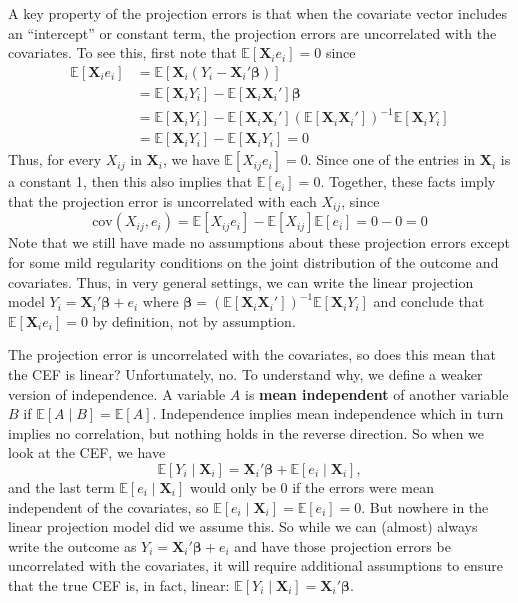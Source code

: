 \documentclass[
  13pt,
  letterpaper,
  DIV=11,
  numbers=noendperiod]{scrreprt}
\newcommand{\mb}{\bm}
\newcommand{\E}{\mathbb{E}}
\newcommand{\cov}{\text{cov}}
\newcommand{\X}{\mb{X}}
\newcommand{\bfbeta}{\mb{\beta}}
\theoremstyle{plain}
\theoremstyle{plain}
\theoremstyle{definition}
\theoremstyle{definition}
\theoremstyle{remark}
\begin{document}
A key property of the projection errors is that when the covariate
vector includes an ``intercept'' or constant term, the projection errors
are uncorrelated with the covariates. To see this, first note that
\(\E[\X_{i}e_{i}] = 0\) since \[ 
\begin{aligned}
  \E[\X_{i}e_{i}] &= \E[\X_{i}(Y_{i} - \X_{i}'\bfbeta)] \\
                  &= \E[\X_{i}Y_{i}] - \E[\X_{i}\X_{i}']\bfbeta \\
                  &= \E[\X_{i}Y_{i}] - \E[\X_{i}\X_{i}']\left(\E[\X_{i}\X_{i}']\right)^{-1}\E[\X_{i}Y_{i}] \\
  &= \E[\X_{i}Y_{i}] - \E[\X_{i}Y_{i}] = 0
\end{aligned}
\] Thus, for every \(X_{ij}\) in \(\X_{i}\), we have
\(\E[X_{ij}e_{i}] = 0\). Since one of the entries in \(\X_i\) is a
constant 1, then this also implies that \(\E[e_{i}] = 0\). Together,
these facts imply that the projection error is uncorrelated with each
\(X_{ij}\), since \[ 
\cov(X_{ij}, e_{i}) = \E[X_{ij}e_{i}] - \E[X_{ij}]\E[e_{i}] = 0 - 0 = 0
\] Note that we still have made no assumptions about these projection
errors except for some mild regularity conditions on the joint
distribution of the outcome and covariates. Thus, in very general
settings, we can write the linear projection model
\(Y_i = \X_i'\bfbeta + e_i\) where
\(\bfbeta = \left(\E[\X_{i}\X_{i}']\right)^{-1}\E[\X_{i}Y_{i}]\) and
conclude that \(\E[\X_{i}e_{i}] = 0\) by definition, not by assumption.

The projection error is uncorrelated with the covariates, so does this
mean that the CEF is linear? Unfortunately, no. To understand why, we
define a weaker version of independence. A variable \(A\) is
\textbf{mean independent} of another variable \(B\) if
\(\E[A \mid B] = \E[A]\). Independence implies mean independence which
in turn implies no correlation, but nothing holds in the reverse
direction. So when we look at the CEF, we have \[ 
\E[Y_{i} \mid \X_{i}] = \X_{i}'\bfbeta + \E[e_{i} \mid \X_{i}],
\] and the last term \(\E[e_{i} \mid \X_{i}]\) would only be 0 if the
errors were mean independent of the covariates, so
\(\E[e_{i} \mid \X_{i}] = \E[e_{i}] = 0\). But nowhere in the linear
projection model did we assume this. So while we can (almost) always
write the outcome as \(Y_i = \X_i'\bfbeta + e_i\) and have those
projection errors be uncorrelated with the covariates, it will require
additional assumptions to ensure that the true CEF is, in fact, linear:
\(\E[Y_{i} \mid \X_{i}] = \X_{i}'\bfbeta\).
\end{document}
